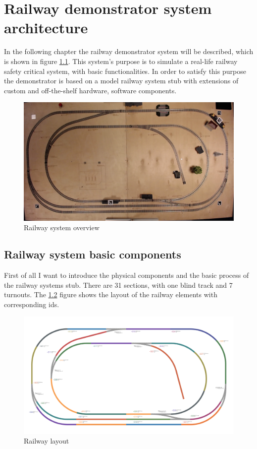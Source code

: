 
\chapter{Railway demonstrator system architecture}
In the following chapter the railway demonstrator system will be described, which is shown in figure \ref{fig:overview}. This system's purpose is to simulate a real-life railway safety critical system, with basic functionalities. In order to satisfy this purpose the demonstrator is based on a model railway system stub with extensions of custom and off-the-shelf hardware, software components. 
\begin{figure}[h]
	\centering
	\includegraphics[width=150mm]{figures/modes3/overview.jpg}
	\caption{Railway system overview}
	\label{fig:overview}
\end{figure}
\section{Railway system basic components}
First of all I want to introduce the physical components and the basic process of the railway systems stub. There are 31 sections, with one blind track and 7 turnouts. The \ref{fig:layout} figure shows the layout of the railway elements with corresponding ids.
\begin{figure}[h]
	\centering
	\includegraphics[width=150mm, keepaspectratio]{figures/modes3/layout2.png}
	\caption{Railway layout}
	\label{fig:layout}
\end{figure}
